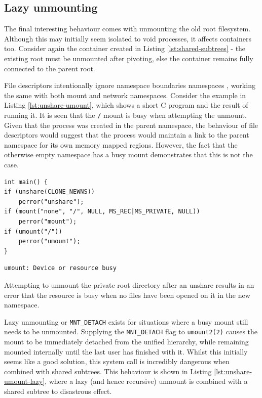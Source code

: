 \documentclass[12pt,a4paper,twoside]{report}
\begin{document}
\subsection{Lazy unmounting}
\label{sec:voiding-mount-lazy-unmount}

The final interesting behaviour comes with unmounting the old root filesystem. Although this may initially seem isolated to void processes, it affects containers too. Consider again the container created in Listing \ref{lst:shared-subtrees} - the existing root must be unmounted after pivoting, else the container remains fully connected to the parent root.

File descriptors intentionally ignore namespace boundaries namespaces \citep{biederman_re_2007}, working the same with both mount and network namespaces. Consider the example in Listing \ref{lst:unshare-umount}, which shows a short C program and the result of running it. It is seen that the \texttt{/} mount is busy when attempting the unmount. Given that the process was created in the parent namespace, the behaviour of file descriptors would suggest that the process would maintain a link to the parent namespace for its own memory mapped regions. However, the fact that the otherwise empty namespace has a busy mount demonstrates that this is not the case.

\begin{listing}
\begin{verbatim}
int main() {
if (unshare(CLONE_NEWNS))
	perror("unshare");
if (mount("none", "/", NULL, MS_REC|MS_PRIVATE, NULL))
	perror("mount");
if (umount("/"))
	perror("umount");
}
\end{verbatim}
\begin{verbatim}
umount: Device or resource busy
\end{verbatim}

\caption{Attempting to unmount the private root directory after an unshare results in an error that the resource is busy when no files have been opened on it in the new namespace.}
\label{lst:unshare-umount}
\end{listing}

Lazy unmounting or \texttt{MNT\_DETACH} exists for situations where a busy mount still needs to be unmounted. Supplying the \texttt{MNT\_DETACH} flag to \texttt{umount2(2)} causes the mount to be immediately detached from the unified hierarchy, while remaining mounted internally until the last user has finished with it. Whilst this initially seems like a good solution, this system call is incredibly dangerous when combined with shared subtrees. This behaviour is shown in Listing \ref{lst:unshare-umount-lazy}, where a lazy (and hence recursive) unmount is combined with a shared subtree to disastrous effect.
\end{document}
